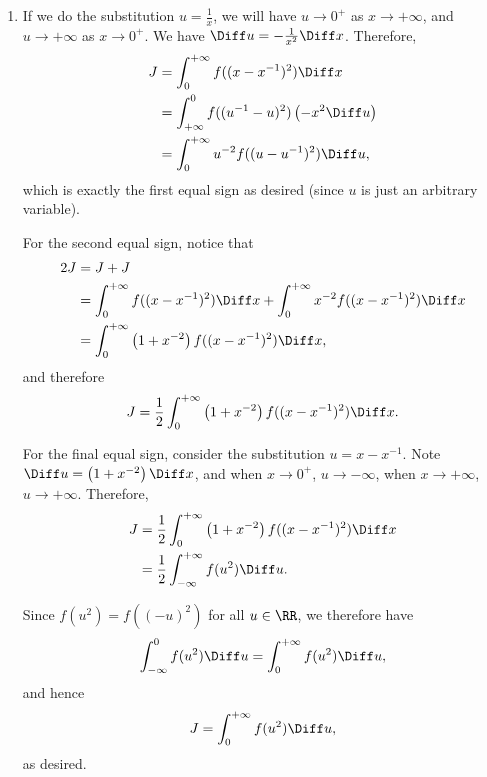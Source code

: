 \begin{enumerate}
    \item If we do the substitution \(u = \frac{1}{x}\), we will have \(u \to 0^{+}\) as \(x \to +\infty\), and \(u \to +\infty\) as \(x \to 0^{+}\). We have \(\Diff u = - \frac{1}{x^2} \Diff x\). Therefore,
          \begin{align*}
              J & = \int_{0}^{+\infty} f((x - x^{-1})^2) \Diff x                    \\
                & = \int_{+\infty}^{0} f((u^{-1} - u)^2) \left(- x^2 \Diff u\right) \\
                & = \int_{0}^{+\infty} u^{-2} f((u - u^{-1})^2) \Diff u,
          \end{align*}
          which is exactly the first equal sign as desired (since \(u\) is just an arbitrary variable).

          For the second equal sign, notice that
          \begin{align*}
              2J & = J + J                                                                                              \\
                 & = \int_{0}^{+\infty} f((x - x^{-1})^2) \Diff x + \int_{0}^{+\infty} x^{-2} f((x - x^{-1})^2) \Diff x \\
                 & = \int_{0}^{+\infty} \left(1 + x^{-2}\right) f((x - x^{-1})^2) \Diff x,
          \end{align*}
          and therefore
          \[
              J = \frac{1}{2} \int_{0}^{+\infty} \left(1 + x^{-2}\right) f((x - x^{-1})^2) \Diff x.
          \]

          For the final equal sign, consider the substitution \(u = x - x^{-1}\). Note \(\Diff u = \left(1 + x^{-2}\right) \Diff x\), and when \(x \to 0^{+}\), \(u \to -\infty\), when \(x \to +\infty\), \(u \to +\infty\). Therefore,
          \begin{align*}
              J & = \frac{1}{2} \int_{0}^{+\infty} \left(1 + x^{-2}\right) f((x - x^{-1})^2) \Diff x \\
                & = \frac{1}{2} \int_{-\infty}^{+\infty} f(u^2) \Diff u.
          \end{align*}

          Since \(f(u^2) = f((-u)^2)\) for all \(u \in \RR\), we therefore have
          \[
              \int_{-\infty}^{0} f(u^2) \Diff u = \int_{0}^{+\infty} f(u^2) \Diff u,
          \]
          and hence
          \[
              J = \int_{0}^{+\infty} f(u^2) \Diff u,
          \]
          as desired.


\end{enumerate}
